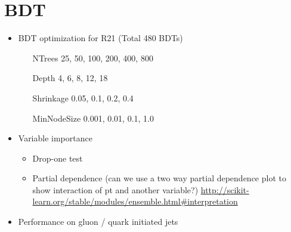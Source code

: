 \chapter{BDT}
\label{sec:bdt}

\begin{itemize}
\item BDT optimization for R21 (Total 480 BDTs)
  \begin{itemize}
  \item[NTrees] 25, 50, 100, 200, 400, 800
  \item[Depth] 4, 6, 8, 12, 18
  \item[Shrinkage] 0.05, 0.1, 0.2, 0.4
  \item[MinNodeSize] 0.001, 0.01, 0.1, 1.0
  \end{itemize}


\item Variable importance
  \begin{itemize}
  \item Drop-one test
  \item Partial dependence (can we use a two way partial dependence plot to
    show interaction of pt and another variable?)
    \url{http://scikit-learn.org/stable/modules/ensemble.html#interpretation}
  \end{itemize}

\item Performance on gluon / quark initiated jets

\end{itemize}

